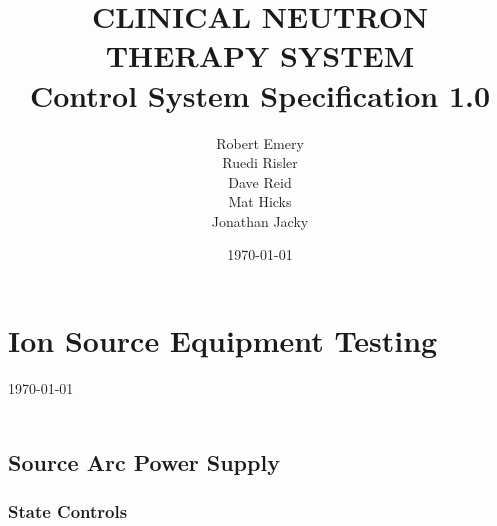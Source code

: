 \documentclass[11pt]{book}		%
\title{CLINICAL NEUTRON THERAPY SYSTEM\\
	Control System Specification 1.0\\[1.0cm]}
\author{Robert Emery\\
	Ruedi Risler\\
	Dave Reid \\
	Mat Hicks \\
        Jonathan Jacky}
\date{\today}
\begin{document}
\chapter{Ion Source Equipment Testing}

\vspace*{-.75in}
\today \\
\vspace*{.75in}
\\

\section{Source Arc Power Supply}

\subsection{State Controls}
\end{document}
